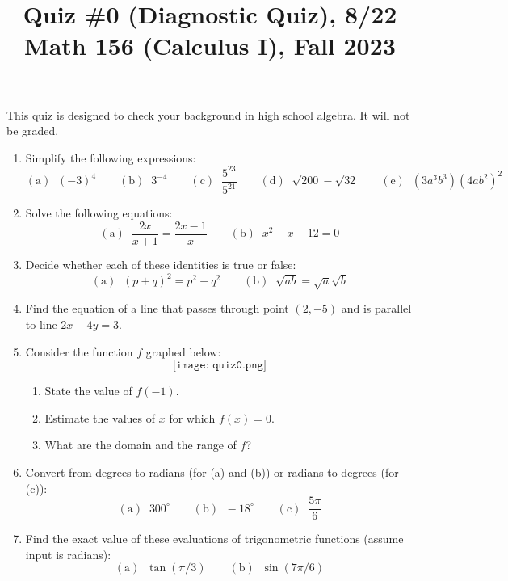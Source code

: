 \documentclass[11pt]{article}
\title{Quiz \#0 (Diagnostic Quiz), 8/22 \\ Math 156 (Calculus I), Fall 2023}
\date{}
\begin{document}
\maketitle

\thispagestyle{empty}

\vspace{-1cm}

This quiz is designed to check your background in high school algebra. It will not be graded.

\begin{enumerate}
\item Simplify the following expressions:
\[ \mathrm{(a)} \; \; (-3)^4 \qquad \mathrm{(b)} \; \; 3^{-4} \qquad \mathrm{(c)} \; \; \frac{5^{23}}{5^{21}} \qquad \mathrm{(d)} \; \; \sqrt{200}-\sqrt{32} \qquad \mathrm{(e)} \; \; (3a^3b^3)(4ab^2)^2 \]
\item Solve the following equations:
\[ \mathrm{(a)} \; \; \frac{2x}{x+1} = \frac{2x-1}{x} \qquad \mathrm{(b)} \; \; x^2 - x -12 = 0\]
\item Decide whether each of these identities is true or false:
\[ \mathrm{(a)} \; \; (p+q)^2 = p^2 + q^2 \qquad \mathrm{(b)} \; \; \sqrt{ab} = \sqrt{a}\sqrt{b}  \]
\item Find the equation of a line that passes through point $(2,-5)$ and is parallel to line $2x-4y=3$.

\item Consider the function $f$ graphed below:
\[ \texttt{[image: quiz0.png]} \]
\begin{enumerate}
\item State the value of $f(-1)$.
\item Estimate the values of $x$ for which $f(x)=0$.
\item What are the domain and the range of $f$?
\end{enumerate}

\item Convert from degrees to radians (for (a) and (b)) or radians to degrees (for (c)):
\[ \mathrm{(a)} \; \; 300^{\circ} \qquad \mathrm{(b)} \; \; -18^{\circ} \qquad \mathrm{(c)} \; \; \frac{5\pi}{6}\]

\item Find the exact value of these evaluations of trigonometric functions (assume input is radians):
\[ \mathrm{(a)} \; \; \tan(\pi/3) \qquad \mathrm{(b)} \; \; \sin(7\pi/6)\]

\end{enumerate}
\end{document}

